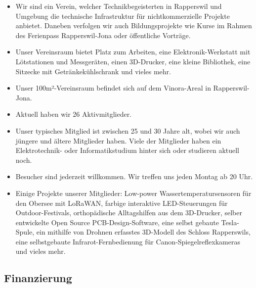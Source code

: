 \documentclass[10pt,a4paper,parskip,fleqn]{scrartcl}
\newcommand{\membercount}{26}
\begin{document}
\begin{itemize}
	\item Wir sind ein Verein, welcher Technikbegeisterten in Rapperswil und
		Umgebung die technische Infrastruktur für nichtkommerzielle Projekte
		anbietet. Daneben verfolgen wir auch Bildungsprojekte wie Kurse im Rahmen
		des Ferienpass Rapperswil-Jona oder öffentliche Vorträge.
	\item Unser Vereinsraum bietet Platz zum Arbeiten, eine Elektronik-Werkstatt mit
		Lötstationen und Messgeräten, einen 3D-Drucker, eine kleine Bibliothek, eine
		Sitzecke mit Getränkekühlschrank und vieles mehr.
	\item Unser 100m²-Vereinsraum befindet sich auf dem Vinora-Areal in
		Rapperswil-Jona.
	\item Aktuell haben wir \membercount{} Aktivmitglieder.
	\item Unser typisches Mitglied ist zwischen 25 und 30 Jahre alt, wobei wir
		auch jüngere und ältere Mitglieder haben. Viele der Mitglieder haben ein
		Elektrotechnik- oder Informatikstudium hinter sich oder studieren aktuell
		noch.
	\item Besucher sind jederzeit willkommen. Wir treffen uns jeden Montag ab 20
		Uhr.
	\item Einige Projekte unserer Mitglieder: Low-power Wassertemperatursensoren
		für den Obersee mit LoRaWAN, farbige interaktive LED-Steuerungen für
		Outdoor-Festivals, orthopädische Alltagshilfen aus dem 3D-Drucker, selber
		entwickelte Open Source PCB-Design-Software, eine selbst gebaute
		Tesla-Spule, ein mithilfe von Drohnen erfasstes 3D-Modell des Schloss
		Rapperswils, eine selbstgebaute Infrarot-Fernbedienung für
		Canon-Spiegelreflexkameras und vieles mehr.
\end{itemize}

\subsection{Finanzierung}
\end{document}
